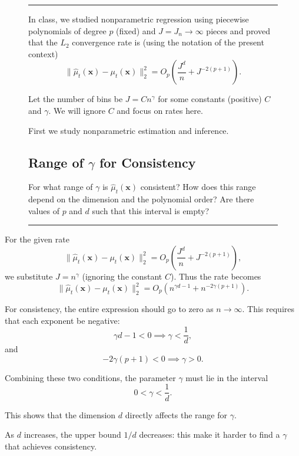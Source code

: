 \documentclass{article}
\newenvironment{colorparagraph}[1]{\par\color{#1}}{\par}
\begin{document}
\begin{figure}[H]
  \begin{colorparagraph}{questioncolor}
  \rule{\textwidth}{0.5pt}
  In class, we studied nonparametric regression using piecewise polynomials of degree \( p \) (fixed) and \( J = J_n \to \infty \) pieces and proved that the \( L_2 \) convergence rate is (using the notation of the present context)
  \[
  \|\hat{\mu}_t(\mathbf{x}) - \mu_t(\mathbf{x})\|_2^2 = O_p\left( \frac{J^d}{n} + J^{-2(p+1)} \right).
  \]

  Let the number of bins be \( J = C n^\gamma \) for some constants (positive) \( C \) and \( \gamma \). We will ignore \( C \) and focus on rates here.

  First we study nonparametric estimation and inference.

  \label{q1c}
  \subsection{Range of \(\gamma\) for Consistency}

  For what range of \( \gamma \) is \( \hat{\mu}_t(\mathbf{x}) \) consistent? How does this range depend on the dimension and the polynomial order? Are there values of \( p \) and \( d \) such that this interval is empty?
  
  \rule{\textwidth}{0.5pt}
  \end{colorparagraph}
\end{figure}

For the given rate
\[
\|\hat{\mu}_t(\mathbf{x}) - \mu_t(\mathbf{x})\|_2^2 = O_p\left( \frac{J^d}{n} + J^{-2(p+1)} \right),
\]
we substitute \( J = n^\gamma \) (ignoring the constant \(C\)). Thus the rate becomes
\[
\|\hat{\mu}_t(\mathbf{x}) - \mu_t(\mathbf{x})\|_2^2 = O_p\left( n^{\gamma d - 1} + n^{-2\gamma(p+1)} \right).
\]

For consistency, the entire expression should go to zero as \( n \to \infty \). This requires that each exponent be negative:
\[
\gamma d - 1 < 0 \implies \gamma < \frac{1}{d},
\]
and
\[
-2\gamma(p+1) < 0 \implies \gamma > 0.
\]

Combining these two conditions, the parameter \(\gamma\) must lie in the interval
\[
0 < \gamma < \frac{1}{d}.
\]

This shows that the dimension \( d \) directly affects the range for \(\gamma\).

As \( d \) increases, the upper bound \( 1/d \) decreases: this make it harder to find a \(\gamma\) that achieves consistency.
\end{document}
